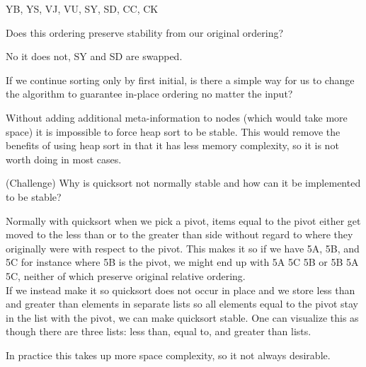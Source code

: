 \begin{solution}
    YB, YS, VJ, VU, SY, SD, CC, CK
\end{solution}

\question Does this ordering preserve stability from our original ordering? 

\begin{solution}
    No it does not, SY and SD are swapped.
\end{solution}

\question If we continue sorting only by first initial, is there a simple way for us to change the algorithm to guarantee in-place ordering no matter the input? 

\begin{solution}
    Without adding additional meta-information to nodes (which would take more space) it is impossible to force heap sort to be stable. This would remove the benefits of using heap sort in that it has less memory complexity, so it is not worth doing in most cases.
\end{solution}

\question (Challenge) Why is quicksort not normally stable and how can it be implemented to be stable?

\begin{solution}
    Normally with quicksort when we pick a pivot, items equal to the pivot either get moved to the less than or to the greater than side without regard to where they originally were with respect to the pivot. This makes it so if we have 5A, 5B, and 5C for instance where 5B is the pivot, we might end up with 5A 5C 5B or 5B 5A 5C, neither of which preserve original relative ordering.\\
    
    If we instead make it so quicksort does not occur in place and we store less than and greater than elements in separate lists so all elements equal to the pivot stay in the list with the pivot, we can make quicksort stable. One can visualize this as though there are three lists: less than, equal to, and greater than lists. 
    
    In practice this takes up more space complexity, so it not always desirable.
\end{solution}
